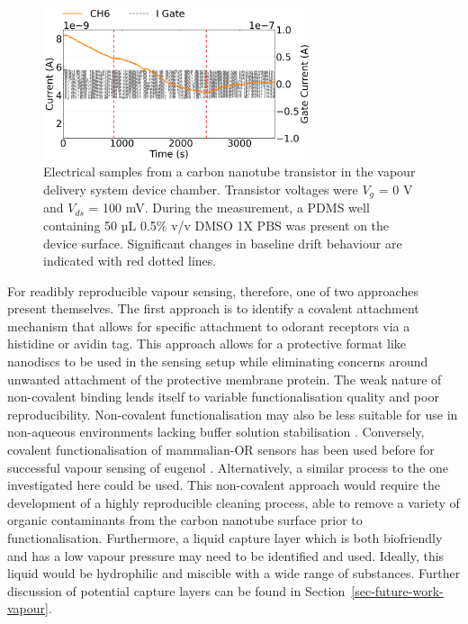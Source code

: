 \documentclass[
  a4paper,
]{scrbook}
\begin{document}
\begin{figure}

{\centering \includegraphics[width=0.7\textwidth,height=\textheight]{figures/ch8/Q39C11.png}

}

\caption{\label{fig-buffer-vapour}Electrical samples from a carbon
nanotube transistor in the vapour delivery system device chamber.
Transistor voltages were \(V_{g}\) = 0 V and \(V_{ds}\) = 100 mV. During
the measurement, a PDMS well containing 50 µL 0.5\% v/v DMSO 1X PBS was
present on the device surface. Significant changes in baseline drift
behaviour are indicated with red dotted lines.}

\end{figure}

For readibly reproducible vapour sensing, therefore, one of two
approaches present themselves. The first approach is to identify a
covalent attachment mechanism that allows for specific attachment to
odorant receptors via a histidine or avidin tag. This approach allows
for a protective format like nanodiscs to be used in the sensing setup
while eliminating concerns around unwanted attachment of the protective
membrane protein. The weak nature of non-covalent binding lends itself
to variable functionalisation quality and poor reproducibility.
Non-covalent functionalisation may also be less suitable for use in
non-aqueous environments lacking buffer solution stabilisation
\autocite{Li2023}. Conversely, covalent functionalisation of
mammalian-OR sensors has been used before for successful vapour sensing
of eugenol \autocite{Goldsmith2011}. Alternatively, a similar process to
the one investigated here could be used. This non-covalent approach
would require the development of a highly reproducible cleaning process,
able to remove a variety of organic contaminants from the carbon
nanotube surface prior to functionalisation. Furthermore, a liquid
capture layer which is both biofriendly and has a low vapour pressure
may need to be identified and used. Ideally, this liquid would be
hydrophilic and miscible with a wide range of substances. Further
discussion of potential capture layers can be found in
Section~\ref{sec-future-work-vapour}.
\end{document}
